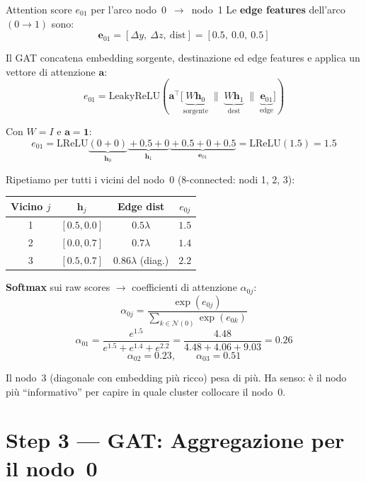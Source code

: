 \documentclass[11pt,a4paper]{article}
\begin{document}
\begin{stepbox}{Attention score $e_{01}$ per l'arco nodo~0~$\to$~nodo~1}
Le \textbf{edge features} dell'arco $(0\to1)$ sono:
\[
\mathbf{e}_{01} = [\Delta y,\ \Delta z,\ \text{dist}] = [0.5,\ 0.0,\ 0.5]
\]

Il GAT concatena embedding sorgente, destinazione ed edge features e applica un vettore di attenzione $\mathbf{a}$:
\[
e_{01} = \text{LeakyReLU}\!\left(\mathbf{a}^\top
\bigl[\underbrace{W\mathbf{h}_0}_{\text{sorgente}}\;\|\;\underbrace{W\mathbf{h}_1}_{\text{dest}}\;\|\;\underbrace{\mathbf{e}_{01}}_{\text{edge}}\bigr]\right)
\]

Con $W=I$ e $\mathbf{a}=\mathbf{1}$:
\[
e_{01} = \text{LReLU}\!\underbrace{(0+0)}_{\mathbf{h}_0}
         \underbrace{{}+0.5+0}_{\mathbf{h}_1}
         \underbrace{{}+0.5+0+0.5}_{\mathbf{e}_{01}}
       = \text{LReLU}(1.5) = 1.5
\]

\medskip
Ripetiamo per tutti i vicini del nodo~0 (8-connected: nodi 1, 2, 3):

\begin{center}
\begin{tabular}{cccc}
\toprule
Vicino $j$ & $\mathbf{h}_j$ & Edge dist & $e_{0j}$\\
\midrule
1 & $[0.5, 0.0]$ & $0.5\lambda$ & $1.5$\\
2 & $[0.0, 0.7]$ & $0.7\lambda$ & $1.4$\\
3 & $[0.5, 0.7]$ & $0.86\lambda$ (diag.) & $2.2$\\
\bottomrule
\end{tabular}
\end{center}

\medskip
\textbf{Softmax} sui raw scores $\to$ coefficienti di attenzione $\alpha_{0j}$:
\[
\alpha_{0j} = \frac{\exp(e_{0j})}{\sum_{k\in\mathcal{N}(0)}\exp(e_{0k})}
\]
\[
\alpha_{01} = \frac{e^{1.5}}{e^{1.5}+e^{1.4}+e^{2.2}}
            = \frac{4.48}{4.48+4.06+9.03} = 0.26
\]
\[
\alpha_{02} = 0.23,\qquad \alpha_{03} = 0.51
\]

Il nodo~3 (diagonale con embedding più ricco) pesa di più. Ha senso: è il nodo più ``informativo'' per capire in quale cluster collocare il nodo~0.
\end{stepbox}

\section*{Step 3 --- GAT: Aggregazione per il nodo~0}
\end{document}
